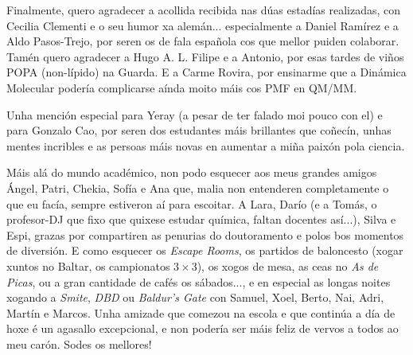 Finalmente, quero agradecer a acollida recibida nas dúas estadías realizadas, con Cecilia Clementi e o seu humor xa alemán... especialmente a Daniel Ramírez e a Aldo Pasos-Trejo, por seren os de fala española cos que mellor puiden colaborar. Tamén quero agradecer a Hugo A. L. Filipe e a Antonio, por esas tardes de viños POPA (non-lípido) na Guarda. E a Carme Rovira, por ensinarme que a Dinámica Molecular podería complicarse aínda moito máis cos PMF en QM/MM.

Unha mención especial para Yeray (a pesar de ter falado moi pouco con el) e para Gonzalo Cao, por seren dos estudantes máis brillantes que coñecín, unhas mentes incribles e as persoas máis novas en aumentar a miña paixón pola ciencia.



Máis alá do mundo académico, non podo esquecer aos meus grandes amigos Ángel, Patri, Chekia, Sofía e Ana que, malia non entenderen completamente o que eu facía, sempre estiveron aí para escoitar. A Lara, Darío (e a Tomás, o profesor-DJ que fixo que quixese estudar química, faltan docentes así...), Silva e Espi, grazas por compartiren as penurias do doutoramento e polos bos momentos de diversión. E como esquecer os \textit{Escape Rooms}, os partidos de baloncesto (xogar xuntos no Baltar, os campionatos $3\times3$), os xogos de mesa, as ceas no \textit{As de Picas}, ou a gran cantidade de cafés os sábados..., e en especial as longas noites xogando a \textit{Smite}, \textit{DBD} ou \textit{Baldur's Gate} con Samuel, Xoel, Berto, Nai, Adri, Martín e Marcos. Unha amizade que comezou na escola e que continúa a día de hoxe é un agasallo excepcional, e non podería ser máis feliz de vervos a todos ao meu carón. Sodes os mellores!



